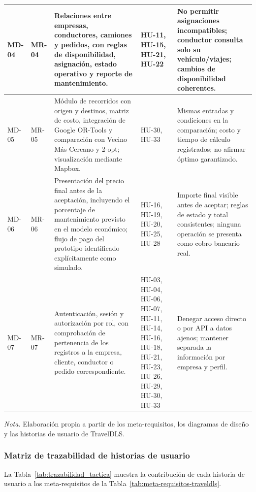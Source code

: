 \begin{longtable}{@{}>{\RaggedRight\arraybackslash}p{1.5cm}>{\RaggedRight\arraybackslash}p{1.8cm}>{\RaggedRight\arraybackslash}p{4.1cm}>{\RaggedRight\arraybackslash}p{2.3cm}>{\RaggedRight\arraybackslash}p{5.3cm}@{}}
		MD-04 & MR-04 & Relaciones entre empresas, conductores, camiones y pedidos, con reglas de disponibilidad, asignación, estado operativo y reporte de mantenimiento. & HU-11, HU-15, HU-21, HU-22 & No permitir asignaciones incompatibles; conductor consulta solo su vehículo/viajes; cambios de disponibilidad coherentes. \\ \midrule
		MD-05 & MR-05 & Módulo de recorridos con origen y destinos, matriz de costo, integración de Google OR-Tools y comparación con Vecino Más Cercano y 2-opt; visualización mediante Mapbox. & HU-30, HU-33 & Mismas entradas y condiciones en la comparación; costo y tiempo de cálculo registrados; no afirmar óptimo garantizado. \\ \midrule
		MD-06 & MR-06 & Presentación del precio final antes de la aceptación, incluyendo el porcentaje de mantenimiento previsto en el modelo económico; flujo de pago del prototipo identificado explícitamente como simulado. & HU-16, HU-19, HU-20, HU-25, HU-28 & Importe final visible antes de aceptar; reglas de estado y total consistentes; ninguna operación se presenta como cobro bancario real. \\ \midrule
		MD-07 & MR-07 & Autenticación, sesión y autorización por rol, con comprobación de pertenencia de los registros a la empresa, cliente, conductor o pedido correspondiente. & HU-03, HU-04, HU-06, HU-07, HU-11, HU-14, HU-16, HU-18, HU-21, HU-23, HU-26, HU-29, HU-30, HU-33 & Denegar acceso directo o por API a datos ajenos; mantener separada la información por empresa y perfil. \\ \midrule
	\end{longtable}
\endgroup

\textit{Nota.} Elaboración propia a partir de los meta-requisitos, los diagramas de diseño y las historias de usuario de TravelDLS.

\subsubsection{Matriz de trazabilidad de historias de usuario}

La Tabla~\ref{tab:trazabilidad_tactica} muestra la contribución de cada historia de usuario a los meta-requisitos de la Tabla~\ref{tab:meta-requisitos-traveldls}.


